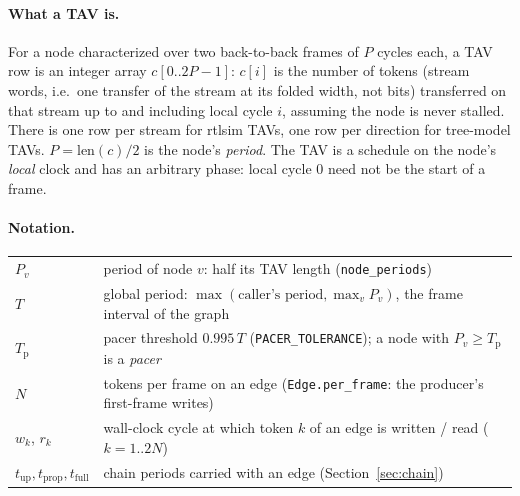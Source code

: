 \documentclass[10pt,a4paper]{article}
\newcommand{\code}[1]{\texttt{#1}}
\newcommand{\Tg}{T}           %
\newcommand{\Tp}{T_{\mathrm{p}}} %
\newcommand{\NF}{N}            %
\begin{document}
\paragraph{What a TAV is.} For a node characterized over two back-to-back frames
of $P$ cycles each, a TAV row is an integer array $c[0..2P-1]$: $c[i]$ is the
number of tokens (stream words, i.e.\ one transfer of the stream at its folded
width, not bits) transferred on that stream up to and including local cycle
$i$, assuming the node is never stalled. There is one row per stream for rtlsim
TAVs, one row per direction for tree-model TAVs. $P = \mathrm{len}(c)/2$ is the
node's \emph{period}. The TAV is a schedule on the node's \emph{local} clock and has an
arbitrary phase: local cycle 0 need not be the start of a frame.

\paragraph{Notation.}
\begin{center}
\begin{tabular}{@{}ll@{}}
\toprule
$P_v$ & period of node $v$: half its TAV length (\code{node\_periods}) \\
$\Tg$ & global period: $\max(\text{caller's period}, \max_v P_v)$, the frame interval of the graph\\
$\Tp$ & pacer threshold $0.995\,\Tg$ (\code{PACER\_TOLERANCE}); a node with $P_v\ge\Tp$ is a \emph{pacer}\\
$\NF$ & tokens per frame on an edge (\code{Edge.per\_frame}: the producer's first-frame writes)\\
$w_k$, $r_k$ & wall-clock cycle at which token $k$ of an edge is written / read ($k=1..2\NF$)\\
$t_{\mathrm{up}}, t_{\mathrm{prop}}, t_{\mathrm{full}}$ & chain periods carried with an edge (Section~\ref{sec:chain})\\
\bottomrule
\end{tabular}
\end{center}
\end{document}
